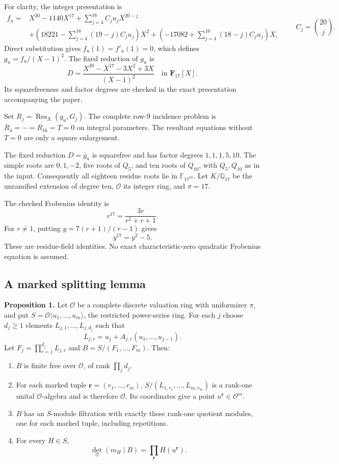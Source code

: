 \documentclass[
  british,
  10pt,
]{article}
\providecommand{\tightlist}{%
  \setlength{\itemsep}{0pt}\setlength{\parskip}{0pt}}
\begin{document}
For clarity, the integer presentation is \[
\begin{aligned}
f_u={}&X^{20}-1140X^{17}
+\sum_{j=4}^{16}C_ju_jX^{20-j}
\\ &+\left(18221-\sum_{j=4}^{16}(19-j)C_ju_j\right)X^2
+\left(-17082+\sum_{j=4}^{16}(18-j)C_ju_j\right)X,
\end{aligned}
\qquad C_j=\binom{20}{j}.
\] Direct substitution gives \(f_u(1)=f'_u(1)=0\), which defines
\(g_u=f_u/(X-1)^2\). The fixed reduction of \(g_u\) is \[
D=\frac{X^{20}-X^{17}-3X^2+3X}{(X-1)^2}\quad\text{in }\mathbf F_{17}[X].
\] Its squarefreeness and factor degrees are checked in the exact
presentation accompanying the paper.

Set \(R_j=\operatorname{Res}_X(g_u,G_j)\). The complete row-9 incidence
problem is \(R_4=\cdots=R_{16}=T=0\) on integral parameters. The
resultant equations without \(T=0\) are only a square enlargement.

The fixed reduction \(D=\bar g_u\) is squarefree and has factor degrees
\(1,1,1,5,10\). The simple roots are \(0,1,-2\), five roots of \(Q_5\),
and ten roots of \(Q_{10}\), with \(Q_5,Q_{10}\) as in the input.
Consequently all eighteen residue roots lie in \(\mathbb F_{17^{10}}\).
Let \(K/\mathbb Q_{17}\) be the unramified extension of degree ten,
\(\mathcal O\) its integer ring, and \(\pi=17\).

The checked Frobenius identity is \[
r^{17}=\frac{3r}{r^2+r+1}.
\] For \(r\ne1\), putting \(y=7(r+1)/(r-1)\) gives \[
y^{17}=y^2-5.
\] These are residue-field identities. No exact characteristic-zero
quadratic Frobenius equation is assumed.

\subsection{A marked splitting lemma}\label{a-marked-splitting-lemma}

\textbf{Proposition 1.} Let \(\mathcal O\) be a complete discrete
valuation ring with uniformizer \(\pi\), and put
\(S=\mathcal O\langle u_1,\ldots,u_m\rangle\), the restricted
power-series ring. For each \(j\) choose \(d_j\geq1\) elements
\(L_{j,1},\ldots,L_{j,d_j}\) such that \[
\overline{L}_{j,r}
=u_j+A_{j,r}(u_1,\ldots,u_{j-1}).
\tag{1}
\] Let \(F_j=\prod_{r=1}^{d_j}L_{j,r}\) and \(B=S/(F_1,\ldots,F_m)\).
Then:

\begin{enumerate}
\def\labelenumi{\arabic{enumi}.}
\tightlist
\item
  \(B\) is finite free over \(\mathcal O\), of rank \(\prod_jd_j\).
\item
  For each marked tuple \(\mathbf r=(r_1,\ldots,r_m)\),
  \(S/(L_{1,r_1},\ldots,L_{m,r_m})\) is a rank-one unital
  \(\mathcal O\)-algebra and is therefore \(\mathcal O\). Its
  coordinates give a point \(u^{\mathbf r}\in\mathcal O^m\).
\item
  \(B\) has an \(S\)-module filtration with exactly these rank-one
  quotient modules, one for each marked tuple, including repetitions.
\item
  For every \(H\in S\), \[
  \det_{\mathcal O}(m_H\mid B)
  =\prod_{\mathbf r}H(u^{\mathbf r}).
  \tag{2}
  \]
\end{enumerate}
\end{document}
